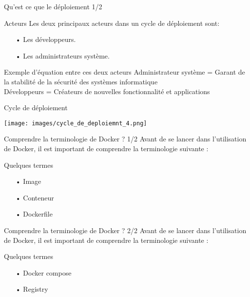 \documentclass[a4paper]{beamer}
\begin{document}
{\begin{frame}{Qu'est ce que le déploiement 1/2}
	\begin{block}{Acteurs}
	Les deux principaux acteurs dans un cycle de déploiement sont:
	\begin{itemize}
	\item[•] Les développeurs.
	\item[•] Les administrateurs système.
	\end{itemize}
	\end{block}
	\begin{block}{Exemple d'équation entre ces deux acteurs}
	Administrateur système = Garant de la stabilité de la sécurité des systèmes informatique\\
    Développeurs = Créateurs de nouvelles fonctionnalité et applications
	\end{block}
\end{frame}

\begin{frame}{Cycle de déploiement}
\begin{center}
\texttt{[image: images/cycle\_de\_deploiemnt\_4.png]}
\end{center}
\end{frame}

\begin{frame}{Comprendre la terminologie de Docker ? 1/2}
Avant de se lancer dans l'utilisation de Docker, il est important de comprendre la terminologie suivante :
\begin{block}{Quelques termes}
\begin{itemize}
\item[•] Image
\item[•] Conteneur
\item[•] Dockerfile 
\end{itemize}
\end{block}
\end{frame}

\begin{frame}{Comprendre la terminologie de Docker ? 2/2}
Avant de se lancer dans l'utilisation de Docker, il est important de comprendre la terminologie suivante :
\begin{block}{Quelques termes}
\begin{itemize}
\item[•] Docker compose
\item[•] Registry
\end{itemize}
\end{block}
\end{frame}


}
\end{document}
